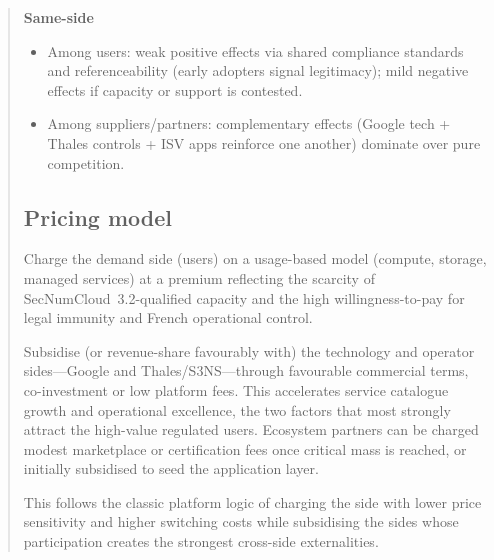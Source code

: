 \begin{quote}
\textbf{Same-side}
\begin{itemize}
    \item Among users: weak positive effects via shared compliance standards and referenceability (early adopters signal legitimacy); mild negative effects if capacity or support is contested.
    \item Among suppliers/partners: complementary effects (Google tech + Thales controls + ISV apps reinforce one another) dominate over pure competition.
\end{itemize}

\subsection*{Pricing model}
Charge the demand side (users) on a usage-based model (compute, storage, managed services) at a premium reflecting the scarcity of SecNumCloud~3.2-qualified capacity and the high willingness-to-pay for legal immunity and French operational control.

Subsidise (or revenue-share favourably with) the technology and operator sides—Google and Thales/S3NS—through favourable commercial terms, co-investment or low platform fees. This accelerates service catalogue growth and operational excellence, the two factors that most strongly attract the high-value regulated users. Ecosystem partners can be charged modest marketplace or certification fees once critical mass is reached, or initially subsidised to seed the application layer.

This follows the classic platform logic of charging the side with lower price sensitivity and higher switching costs while subsidising the sides whose participation creates the strongest cross-side externalities.
\end{quote}

